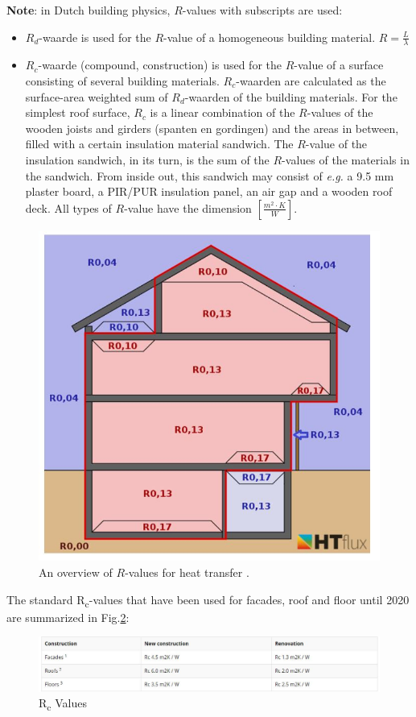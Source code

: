 \textbf{Note}: in Dutch building physics, $R$-values with subscripts are used:
\begin{itemize}
	\item $R_d$-waarde is used for the $R$-value of a homogeneous building material. $ R = \frac{L}{\lambda} $
	\item $R_c$-waarde (compound, construction) is used for the $R$-value of a surface consisting of several building materials. $R_c$-waarden are calculated as the surface-area weighted sum of $R_d$-waarden of the building materials. 
	For the simplest roof surface, $R_c$ is a linear combination of the $R$-values of the wooden joists and girders (spanten en gordingen) and the areas in between, filled with a certain insulation material sandwich.
	The $R$-value of the insulation sandwich, in its turn, is the sum of the $R$-values of the materials in the sandwich. From inside out, this sandwich may consist of \textit{e.g.} a 9.5 mm plaster board, a PIR/PUR insulation panel, an air gap and a wooden roof deck. All types of $R$-value have the dimension $ [\frac{m^2 \cdot K}{W}] $.
\end{itemize}

\begin{figure}[H]
	\centering
	\includegraphics[width=0.6\columnwidth]{Figures/Overview of heat resistances.JPG}
	\caption[Short title]{An overview of $R$-values for heat transfer \cite{SURFREST}.}
	\label{fig:overview}
\end{figure}


The standard R\textsubscript{c}-values that have been used for facades, roof and floor until 2020 are summarized in Fig.\ref{fig:Rcvalues}:

\begin{figure}[H]
	\centering
	\includegraphics[width=1.0\columnwidth]{Figures/Rc_values_2020.JPG}
	\caption[Short title]{R\textsubscript{c} Values \cite{ISOL}}
	\label{fig:Rcvalues}
\end{figure}

